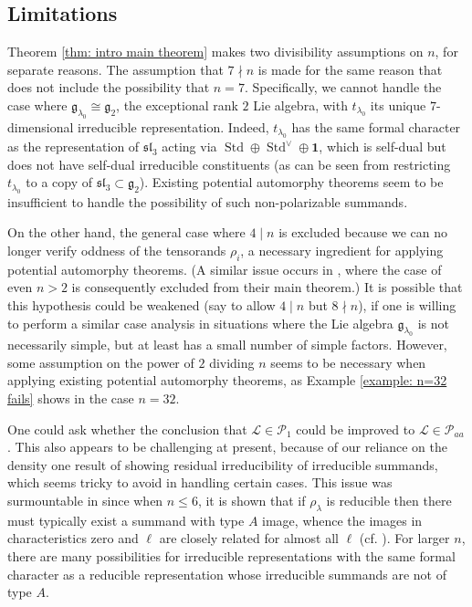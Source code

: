\documentclass{amsart}
\theoremstyle{definition}
\numberwithin{equation}{section} %
\newcommand{\sllie}{\mathfrak{sl}}
\newcommand{\Std}{\operatorname{Std}}
\newcommand{\mc}[1]{\mathcal{#1}}
\newcommand{\mf}[1]{\mathfrak{#1}}
\begin{document}
\subsection{Limitations}

Theorem \ref{thm: intro main theorem} makes two divisibility assumptions on $n$, for separate reasons. 
The assumption that \( 7\nmid n \) is made for the same reason that \cite{Xia19} does not include the possibility that $n=7$.
Specifically, we cannot handle the case where \( \mf{g}_{\lambda_0}\cong \mf{g}_2 \), the exceptional rank \( 2 \) Lie algebra, with \( t_{\lambda_0} \) its unique \( 7 \)-dimensional irreducible representation.
Indeed, \( t_{\lambda_0} \) has the same formal character as the representation of \( \mf{sl}_3 \) acting via \( \Std\oplus\Std^{\vee}\oplus\mathbf{1} \), which is self-dual but does not have self-dual irreducible constituents (as can be seen from restricting $t_{\lambda_0}$ to a copy of $\sllie_3 \subset \mf{g}_2$).
Existing potential automorphy theorems seem to be insufficient to handle the possibility of such non-polarizable summands.

On the other hand, the general case where \( 4\mid n \) is excluded because we can no longer verify oddness of the tensorands \( \rho_i \), a necessary ingredient for applying potential automorphy theorems.
(A similar issue occurs in \cite{CEG22}, where the case of even $n>2$ is consequently excluded from their main theorem.)
It is possible that this hypothesis could be weakened (say to allow \( 4\mid n \) but $8 \nmid n$), if one is willing to perform a similar case analysis in situations where the Lie algebra $\mf{g}_{\lambda_0}$ is not necessarily simple, but at least has a small number of simple factors.
However, some assumption on the power of $2$ dividing $n$ seems to be necessary when applying existing potential automorphy theorems, as Example \ref{example: n=32 fails} shows in the case $n=32$.

One could ask whether the conclusion that $\mathcal{L} \in \mc{P}_1$ could be improved to $\mc{L} \in \mc{P}_{aa}$.
This also appears to be challenging at present, because of our reliance on the density one result of \cite{BLGGT14} showing residual irreducibility of irreducible summands, which seems tricky to avoid in handling certain cases.
This issue was surmountable in \cite{Hui23} since when $n \leq 6$, it is shown that if $\rho_{\lambda}$ is reducible then there must typically exist a summand with type $A$ image, whence the images in characteristics zero and $\ell$ are closely related for almost all $\ell$ (cf. \cite[Theorem 3.12]{Hui23}).
For larger $n$, there are many possibilities for irreducible representations with the same formal character as a reducible representation whose irreducible summands are not of type $A$.
\end{document}
